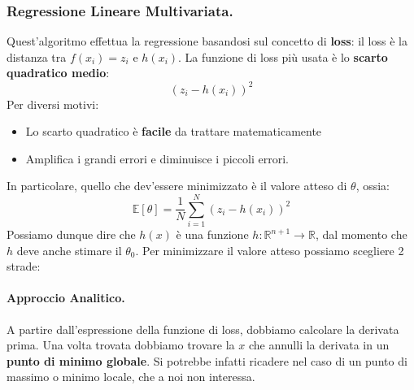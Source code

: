 \subsubsection{Regressione Lineare Multivariata.}Quest'algoritmo effettua la regressione basandosi sul concetto di \textbf{loss}:
il loss è la distanza tra $f(x_i) = z_i$ e $h(x_i)$.
La funzione di loss più usata è lo \textbf{scarto quadratico medio}:
\begin{equation}
    (z_i - h(x_i))^2
\end{equation}
Per diversi motivi:
\begin{itemize}
    \item Lo scarto quadratico è \textbf{facile }da trattare matematicamente
    \item Amplifica i grandi errori e diminuisce i piccoli errori.
\end{itemize}
In particolare, quello che dev'essere minimizzato è il valore atteso di $\theta$, ossia: 
\begin{equation}
    \mathbb{E}[\theta] = \frac{1}{N} \sum_{i = 1}^{N}(z_i - h(x_i))^2
\end{equation}
Possiamo dunque dire che $h(x)$ è una funzione $h : \mathbb{R}^{n + 1} \to \mathbb{R}$, dal momento che $h$ deve anche stimare il $\theta_0$.
Per minimizzare il valore atteso possiamo scegliere 2 strade:
\paragraph{Approccio Analitico.}A partire dall'espressione della funzione di loss, dobbiamo calcolare la derivata prima. Una volta trovata dobbiamo
trovare la $x$ che annulli la derivata in un \textbf{punto di minimo globale}. Si potrebbe infatti ricadere nel caso di un punto di massimo o minimo locale,
che a noi non interessa.

